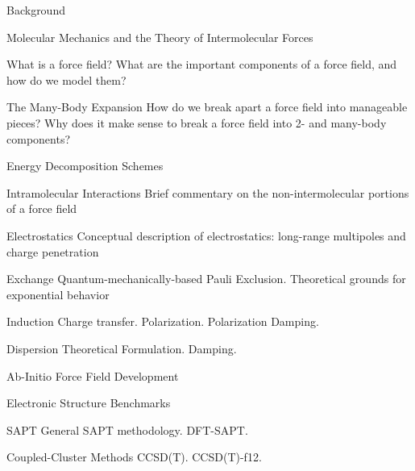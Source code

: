 \begin{chapter}{Background}



\begin{section}{Molecular Mechanics and the Theory of Intermolecular Forces}

What is a force field?
What are the important components of a force field, and how do we model them?
%
\begin{subsection}{The Many-Body Expansion}
How do we break apart a force field into manageable pieces? Why does it make
sense to break a force field into 2- and many-body components?
\end{subsection}
\begin{subsection}{Energy Decomposition Schemes}
\begin{subsubsection}{Intramolecular Interactions}
Brief commentary on the non-intermolecular portions of a force field
\end{subsubsection}
\begin{subsubsection}{Electrostatics}
Conceptual description of electrostatics: long-range multipoles and charge
penetration
\end{subsubsection}
\begin{subsubsection}{Exchange}
Quantum-mechanically-based Pauli Exclusion.
Theoretical grounds for exponential behavior
\end{subsubsection}
\begin{subsubsection}{Induction}
Charge transfer.
Polarization.
Polarization Damping.
\end{subsubsection}
\begin{subsubsection}{Dispersion}
Theoretical Formulation.
Damping.
\end{subsubsection}
\end{subsection}
%
\end{section}


\begin{section}{Ab-Initio Force Field Development}
\begin{subsection}{Electronic Structure Benchmarks}
\begin{subsubsection}{SAPT}
General SAPT methodology.
DFT-SAPT.
\end{subsubsection}
\begin{subsubsection}{Coupled-Cluster Methods}
CCSD(T).
CCSD(T)-f12.
\end{subsubsection}
\end{subsection}
\end{section}



\end{chapter}
